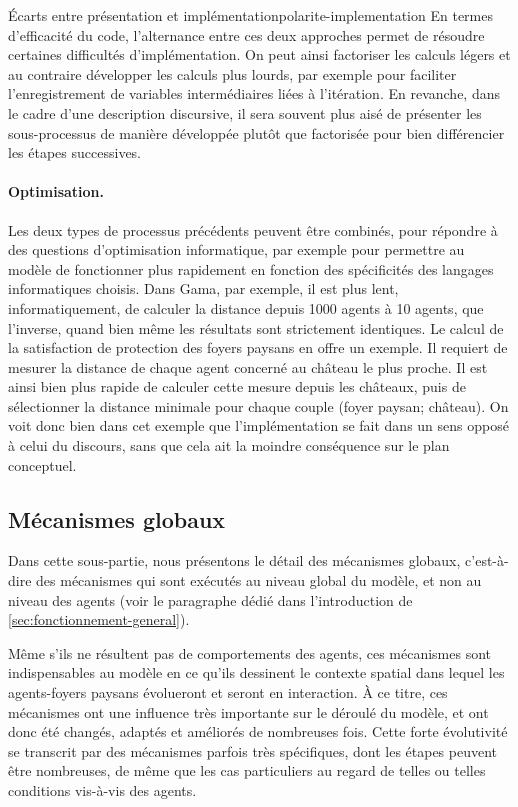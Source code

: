 \begin{encadre}{Écarts entre présentation et implémentation}{polarite-implementation}
En termes d'efficacité du code, l'alternance entre ces deux approches permet de résoudre certaines difficultés d'implémentation.
On peut ainsi factoriser les calculs légers et au contraire développer les calculs plus lourds, par exemple pour faciliter l'enregistrement de variables intermédiaires liées à l'itération. 
En revanche, dans le cadre d'une description discursive, il sera souvent plus aisé de présenter les sous-processus de manière développée plutôt que factorisée pour bien différencier les étapes successives.

\paragraph{Optimisation.} Les deux types de processus précédents peuvent être combinés, pour répondre à des questions d'optimisation informatique, par exemple pour permettre au modèle de fonctionner plus rapidement en fonction des spécificités des langages informatiques choisis.
Dans Gama, par exemple, il est plus lent, informatiquement, de calculer la distance depuis 1000 agents à 10 agents, que l'inverse, quand bien même les résultats sont strictement identiques.
Le calcul de la satisfaction de protection des foyers paysans en offre un exemple.
Il requiert de mesurer la distance de chaque agent concerné au château le plus proche.
Il est ainsi bien plus rapide de calculer cette mesure depuis les châteaux, puis de sélectionner la distance minimale pour chaque couple (foyer paysan; château).
On voit donc bien dans cet exemple que l'implémentation se fait dans un sens opposé à celui du discours, sans que cela ait la moindre conséquence sur le plan conceptuel.
\end{encadre}

\subsection{Mécanismes globaux}

Dans cette sous-partie, nous présentons le détail des mécanismes \og globaux\fg{}, c'est-à-dire des mécanismes qui sont exécutés au niveau global du modèle, et non au niveau des agents (voir le paragraphe dédié dans l'introduction de \cref{sec:fonctionnement-general}).

Même s'ils ne résultent pas de comportements des agents, ces mécanismes sont indispensables au modèle en ce qu'ils dessinent le contexte spatial dans lequel les agents-foyers paysans évolueront et seront en interaction.
À ce titre, ces mécanismes ont une influence très importante sur le déroulé du modèle, et ont donc été changés, adaptés et améliorés de nombreuses fois.
Cette forte évolutivité se transcrit par des mécanismes parfois très spécifiques, dont les étapes peuvent être nombreuses, de même que les cas particuliers au regard de telles ou telles conditions vis-à-vis des agents.

